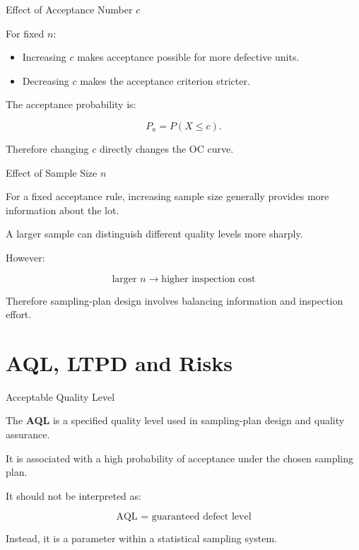 \documentclass[aspectratio=169,10pt]{beamer}
\begin{document}
\begin{frame}[shrink=18]{Effect of Acceptance Number \(c\)}
\small

For fixed \(n\):

\begin{itemize}
    \item Increasing \(c\) makes acceptance possible for more
    defective units.
    \item Decreasing \(c\) makes the acceptance criterion stricter.
\end{itemize}

The acceptance probability is:

\[
P_a=P(X\le c).
\]

Therefore changing \(c\) directly changes the OC curve.

\end{frame}


\begin{frame}[shrink=18]{Effect of Sample Size \(n\)}
\small

For a fixed acceptance rule, increasing sample size generally
provides more information about the lot.

A larger sample can distinguish different quality levels more
sharply.

However:

\[
\boxed{
\text{larger }n
\rightarrow
\text{higher inspection cost}
}
\]

Therefore sampling-plan design involves balancing information
and inspection effort.

\end{frame}


\section{AQL, LTPD and Risks}

\begin{frame}[shrink=18]{Acceptable Quality Level}
\small

The \textbf{AQL} is a specified quality level used in sampling-plan
design and quality assurance.

It is associated with a high probability of acceptance under the
chosen sampling plan.

It should not be interpreted as:

\[
\boxed{
\text{AQL = guaranteed defect level}
}
\]

Instead, it is a parameter within a statistical sampling system.

\end{frame}
\end{document}
